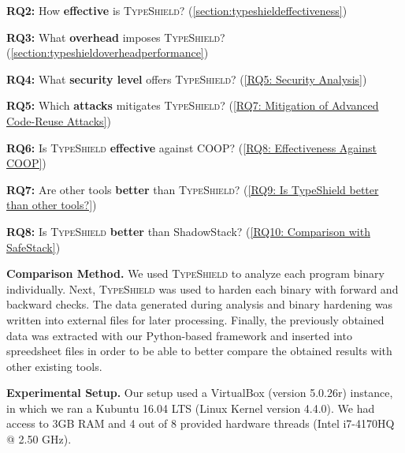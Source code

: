 \hspace{-.27cm}
\textbf{RQ2:} How \textbf{effective} is \textsc{TypeShield}? (\cref{section:typeshieldeffectiveness})

\hspace{-.27cm}
\textbf{RQ3:} What \textbf{overhead} imposes \textsc{TypeShield}? (\cref{section:typeshieldoverheadperformance})

\hspace{-.27cm}
\textbf{RQ4:} What \textbf{security level} offers \textsc{TypeShield}? (\cref{RQ5: Security Analysis})


\hspace{-.27cm}
\textbf{RQ5:} Which \textbf{attacks} mitigates \textsc{TypeShield}? (\cref{RQ7: Mitigation of Advanced Code-Reuse Attacks})

\hspace{-.27cm}
\textbf{RQ6:} Is \textsc{TypeShield} \textbf{effective} against COOP? (\cref{RQ8: Effectiveness Against COOP})

\hspace{-.27cm}
\textbf{RQ7:} Are other tools \textbf{better} than \textsc{TypeShield}? (\cref{RQ9: Is TypeShield better than other tools?})

\hspace{-.27cm}
\textbf{RQ8:} Is \textsc{TypeShield} \textbf{better} than ShadowStack? (\cref{RQ10: Comparison with SafeStack})


\textbf{Comparison Method.} We used \textsc{TypeShield} to analyze each program binary individually. Next, \textsc{TypeShield} was used to harden each binary with forward and 
backward checks. The data generated during analysis and binary hardening was written into external files for later processing. Finally, the previously obtained 
data was extracted with our Python-based framework and inserted into spreedsheet files in order to be able to better compare the obtained 
results with other existing tools.

\textbf{Experimental Setup.} Our setup used a VirtualBox (version 5.0.26r) instance, in which we ran a Kubuntu 16.04 LTS (Linux Kernel
version 4.4.0). We had access to 3GB RAM and 4 out of 8 provided hardware threads (Intel i7-4170HQ @ 2.50 GHz).

